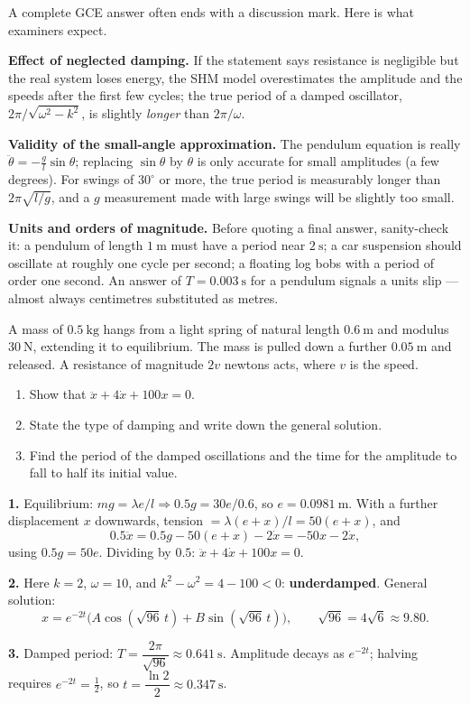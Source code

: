 \documentclass[11pt]{article}
\newcounter{popsec}
\newcounter{popsub}
\newcommand{\courssub}[1]{%
  \stepcounter{popsub}%
  \par\vspace{9pt}\noindent{\popxbold\fontsize{11.5}{13}\selectfont\color{popink}{\color{poporange}\thepopsec.\thepopsub}\hspace{6pt}#1}\par\nopagebreak\vspace{4pt}
}
\begin{document}
\courssub{Checking and Criticising a Model}

A complete GCE answer often ends with a discussion mark. Here is what examiners expect.

\textbf{Effect of neglected damping.} If the statement says resistance is negligible but the real system loses energy, the SHM model overestimates the amplitude and the speeds after the first few cycles; the true period of a damped oscillator, $2\pi/\sqrt{\omega^{2}-k^{2}}$, is slightly \emph{longer} than $2\pi/\omega$.

\textbf{Validity of the small-angle approximation.} The pendulum equation is really $\ddot{\theta} = -\frac{g}{l}\sin\theta$; replacing $\sin\theta$ by $\theta$ is only accurate for small amplitudes (a few degrees). For swings of $30^{\circ}$ or more, the true period is measurably longer than $2\pi\sqrt{l/g}$, and a $g$ measurement made with large swings will be slightly too small.

\textbf{Units and orders of magnitude.} Before quoting a final answer, sanity-check it: a pendulum of length $1\ \mathrm{m}$ must have a period near $2\ \mathrm{s}$; a car suspension should oscillate at roughly one cycle per second; a floating log bobs with a period of order one second. An answer of $T = 0.003\ \mathrm{s}$ for a pendulum signals a units slip — almost always centimetres substituted as metres.

\begin{exercice}
A mass of $0.5\ \mathrm{kg}$ hangs from a light spring of natural length $0.6\ \mathrm{m}$ and modulus $30\ \mathrm{N}$, extending it to equilibrium. The mass is pulled down a further $0.05\ \mathrm{m}$ and released. A resistance of magnitude $2v$ newtons acts, where $v$ is the speed.
\begin{enumerate}
\item Show that $\ddot{x} + 4\dot{x} + 100x = 0$.
\item State the type of damping and write down the general solution.
\item Find the period of the damped oscillations and the time for the amplitude to fall to half its initial value.
\end{enumerate}
\end{exercice}

\begin{corrige}[Exercise 1]
\textbf{1.} Equilibrium: $mg = \lambda e/l \Rightarrow 0.5g = 30e/0.6$, so $e = 0.0981\ \mathrm{m}$. With a further displacement $x$ downwards, tension $= \lambda(e+x)/l = 50(e+x)$, and
\[
0.5\ddot{x} = 0.5g - 50(e+x) - 2\dot{x} = -50x - 2\dot{x},
\]
using $0.5g = 50e$. Dividing by $0.5$: $\ddot{x} + 4\dot{x} + 100x = 0$.

\textbf{2.} Here $k = 2$, $\omega = 10$, and $k^{2} - \omega^{2} = 4 - 100 < 0$: \textbf{underdamped}. General solution:
\[
x = e^{-2t}\bigl(A\cos(\sqrt{96}\,t) + B\sin(\sqrt{96}\,t)\bigr), \qquad \sqrt{96} = 4\sqrt{6} \approx 9.80.
\]

\textbf{3.} Damped period: $T = \dfrac{2\pi}{\sqrt{96}} \approx 0.641\ \mathrm{s}$. Amplitude decays as $e^{-2t}$; halving requires $e^{-2t} = \tfrac12$, so $t = \dfrac{\ln 2}{2} \approx 0.347\ \mathrm{s}$.
\end{corrige}
\end{document}
